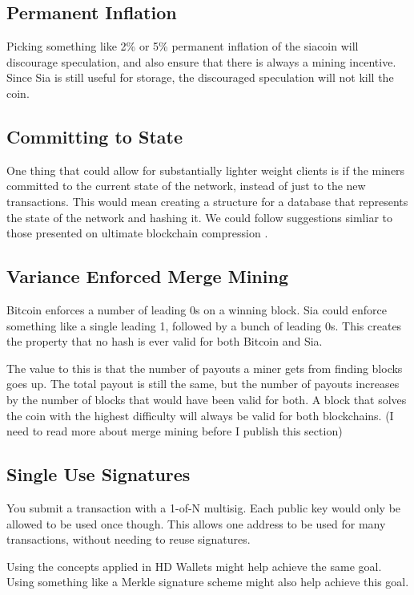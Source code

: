 \documentclass[twocolumn]{article}
\begin{document}
\subsection{Permanent Inflation}
Picking something like 2\% or 5\% permanent inflation of the siacoin will discourage speculation, and also ensure that there is always a mining incentive.
Since Sia is still useful for storage, the discouraged speculation will not kill the coin.

\subsection{Committing to State}
One thing that could allow for substantially lighter weight clients is if the miners committed to the current state of the network, instead of just to the new transactions.
This would mean creating a structure for a database that represents the state of the network and hashing it.
We could follow suggestions simliar to those presented on ultimate blockchain compression \cite{ubc}.

\subsection{Variance Enforced Merge Mining}
Bitcoin enforces a number of leading 0s on a winning block.
Sia could enforce something like a single leading 1, followed by a bunch of leading 0s.
This creates the property that no hash is ever valid for both Bitcoin and Sia.

The value to this is that the number of payouts a miner gets from finding blocks goes up.
The total payout is still the same, but the number of payouts increases by the number of blocks that would have been valid for both.
A block that solves the coin with the highest difficulty will always be valid for both blockchains.
(I need to read more about merge mining before I publish this section)

\subsection{Single Use Signatures}
You submit a transaction with a 1-of-N multisig.
Each public key would only be allowed to be used once though.
This allows one address to be used for many transactions, without needing to reuse signatures.

Using the concepts applied in HD Wallets \cite{hdw} might help achieve the same goal.
Using something like a Merkle signature scheme might also help achieve this goal.
\end{document}
